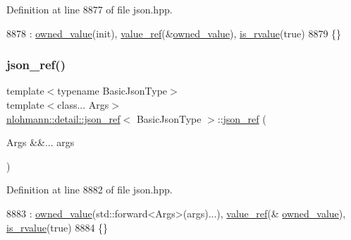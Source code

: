 Definition at line 8877 of file json.\+hpp.


\begin{DoxyCode}
8878         : \hyperlink{classnlohmann_1_1detail_1_1json__ref_a5d7bd67a5ab713d9be1e248cf9d509cd}{owned\_value}(init), \hyperlink{classnlohmann_1_1detail_1_1json__ref_a23504615c2076070d5e087443bb376a4}{value\_ref}(&\hyperlink{classnlohmann_1_1detail_1_1json__ref_a5d7bd67a5ab713d9be1e248cf9d509cd}{owned\_value}), 
      \hyperlink{classnlohmann_1_1detail_1_1json__ref_a434d1e18c21cc1b61954ba22b62ee7a5}{is\_rvalue}(\textcolor{keyword}{true})
8879     \{\}
\end{DoxyCode}
\mbox{\label{classnlohmann_1_1detail_1_1json__ref_abe3ef8c2f07430bd5699bbd552f9e9c3}} 
\subsubsection{\texorpdfstring{json\+\_\+ref()}{json\_ref()}\hspace{0.1cm}{\footnotesize\ttfamily [4/6]}}
{\footnotesize\ttfamily template$<$typename Basic\+Json\+Type$>$ \\
template$<$class... Args$>$ \\
\hyperlink{classnlohmann_1_1detail_1_1json__ref}{nlohmann\+::detail\+::json\+\_\+ref}$<$ Basic\+Json\+Type $>$\+::\hyperlink{classnlohmann_1_1detail_1_1json__ref}{json\+\_\+ref} (\begin{DoxyParamCaption}\item[{Args \&\&...}]{args }\end{DoxyParamCaption})\hspace{0.3cm}{\ttfamily [inline]}}



Definition at line 8882 of file json.\+hpp.


\begin{DoxyCode}
8883         : \hyperlink{classnlohmann_1_1detail_1_1json__ref_a5d7bd67a5ab713d9be1e248cf9d509cd}{owned\_value}(std::forward<Args>(args)...), \hyperlink{classnlohmann_1_1detail_1_1json__ref_a23504615c2076070d5e087443bb376a4}{value\_ref}(&
      \hyperlink{classnlohmann_1_1detail_1_1json__ref_a5d7bd67a5ab713d9be1e248cf9d509cd}{owned\_value}), \hyperlink{classnlohmann_1_1detail_1_1json__ref_a434d1e18c21cc1b61954ba22b62ee7a5}{is\_rvalue}(\textcolor{keyword}{true})
8884     \{\}
\end{DoxyCode}
\mbox{\label{classnlohmann_1_1detail_1_1json__ref_a59221ddbd756ca24d289c787fab38dbc}} 
